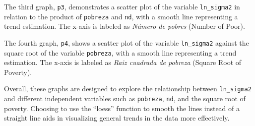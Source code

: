 \documentclass[
  12pt,
]{book}
\begin{document}
The third graph, \texttt{p3}, demonstrates a scatter plot of the variable \texttt{ln\_sigma2} in relation to the product of \texttt{pobreza} and \texttt{nd}, with a smooth line representing a trend estimation. The x-axis is labeled as \emph{Número de pobres} (Number of Poor).

The fourth graph, \texttt{p4}, shows a scatter plot of the variable \texttt{ln\_sigma2} against the square root of the variable \texttt{pobreza}, with a smooth line representing a trend estimation. The x-axis is labeled as \emph{Raiz cuadrada de pobreza} (Square Root of Poverty).

Overall, these graphs are designed to explore the relationship between \texttt{ln\_sigma2} and different independent variables such as \texttt{pobreza}, \texttt{nd}, and the square root of poverty. Choosing to use the ``loess'' function to smooth the lines instead of a straight line aids in visualizing general trends in the data more effectively.
\end{document}
